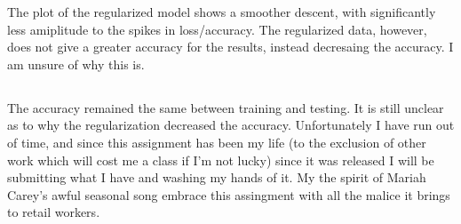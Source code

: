 \documentclass{article}
\begin{document}
The plot of the regularized model shows a smoother descent, with significantly less amiplitude to the spikes in loss/accuracy. The regularized data, however, does not give a greater accuracy for the results, instead decresaing the accuracy. I am unsure of why this is.

\subsection{}

The accuracy remained the same between training and testing. It is still unclear as to why the regularization decreased the accuracy. Unfortunately I have run out of time, and since this assignment has been my life (to the exclusion of other work which will cost me a class if I'm not lucky) since it was released I will be submitting what I have and washing my hands of it. My the spirit of Mariah Carey's awful seasonal song embrace this assingment with all the malice it brings to retail workers. 
\end{document}
